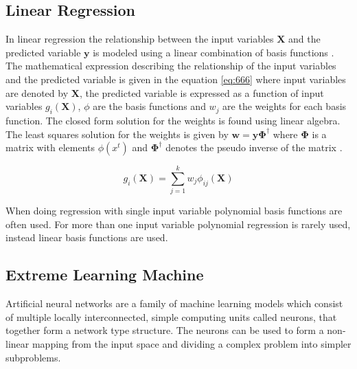 
\subsection{Linear Regression}
In linear regression the relationship between the input variables $\mathbf{X}$ and the predicted variable $\mathbf{y}$ is modeled using a linear combination of basis functions \cite{alpaydin:2004:introduction}. The mathematical expression describing the relationship of the input variables and the predicted variable is given in the equation \ref{eq:666} where input variables are denoted by $\mathbf{X}$, the predicted variable is expressed as a function of input variables $g_{i}(\mathbf{X})$, $\phi$ are the basis functions and $w_{j}$ are the weights for each basis function. The closed form solution for the weights is found using linear algebra. The least squares solution for the weights is given by $\mathbold{w = y\Phi^{\dagger}}$ where $\mathbold{\Phi}$ is a matrix with elements $\phi(x^{t})$ and $\mathbold{\Phi^{\dagger}}$ denotes the pseudo inverse of the matrix \cite{alpaydin:2004:introduction}.

\begin{equation}
    \label{eq:666}
    g_{i}(\mathbf{X}) = \sum^{k}_{j=1}{w_{j}\phi_{ij}(\mathbf{X})}
\end{equation}

When doing regression with single input variable polynomial basis functions are often used. For more than one input variable polynomial regression is rarely used, instead linear basis functions are used. \cite{alpaydin:2004:introduction}

\subsection{Extreme Learning Machine}
Artificial neural networks are a family of machine learning models which consist of multiple locally interconnected, simple computing units called neurons, that together form a network type structure. The neurons can be used to form a non-linear mapping from the input space and dividing a complex problem into simpler subproblems.~\cite{haykin:2009:neural-networks}

